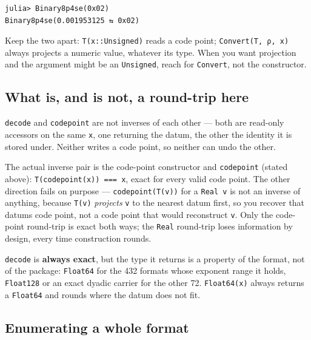 \nopagebreak[4]
\begin{verbatim}
julia> Binary8p4se(0x02)
Binary8p4se(0.001953125 ⇆ 0x02)
\end{verbatim}



Keep the two apart: \texttt{T(x::Unsigned)} reads a code point; \texttt{Convert(T, ρ, x)} always projects a numeric value, whatever its type. When you want projection and the argument might be an \texttt{Unsigned}, reach for \texttt{Convert}, not the constructor.



\subsection{What is, and is not, a round-trip here}



\label{1879508028474309491}{}


\texttt{decode} and \texttt{codepoint} are not inverses of each other — both are read-only accessors on the same \texttt{x}, one returning the datum, the other the identity it is stored under. Neither writes a code point, so neither can undo the other.



The actual inverse pair is the code-point constructor and \texttt{codepoint} (stated above): \texttt{T(codepoint(x)) === x}, exact for every valid code point. The other direction fails on purpose — \texttt{codepoint(T(v))} for a \texttt{Real v} is not an inverse of anything, because \texttt{T(v)} \emph{projects} \texttt{v} to the nearest datum first, so you recover that datum{\textquotesingle}s code point, not a code point that would reconstruct \texttt{v}. Only the code-point round-trip is exact both ways; the \texttt{Real} round-trip loses information by design, every time construction rounds.



\texttt{decode} is \textbf{always exact}, but the type it returns is a property of the format, not of the package: \texttt{Float64} for the 432 formats whose exponent range it holds, \texttt{Float128} or an exact dyadic carrier for the other 72. \texttt{Float64(x)} always returns a \texttt{Float64} and rounds where the datum does not fit.



\subsection{Enumerating a whole format}




